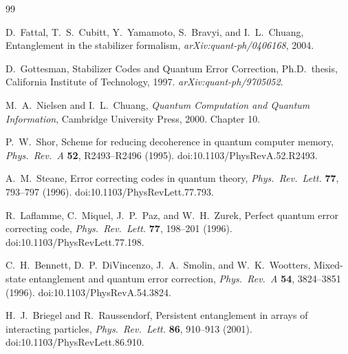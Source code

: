 \documentclass[11pt]{article}
\begin{document}
\begin{thebibliography}{99}

D.~Fattal, T.~S.~Cubitt, Y.~Yamamoto, S.~Bravyi, and I.~L.~Chuang,
Entanglement in the stabilizer formalism,
\textit{arXiv:quant-ph/0406168}, 2004.

D.~Gottesman,
Stabilizer Codes and Quantum Error Correction,
Ph.D.\ thesis, California Institute of Technology, 1997.
\textit{arXiv:quant-ph/9705052}.

M.~A.~Nielsen and I.~L.~Chuang,
\textit{Quantum Computation and Quantum Information},
Cambridge University Press, 2000. Chapter 10.

P.~W.~Shor,
Scheme for reducing decoherence in quantum computer memory,
\textit{Phys.\ Rev.\ A} \textbf{52}, R2493--R2496 (1995).
doi:10.1103/PhysRevA.52.R2493.

A.~M.~Steane,
Error correcting codes in quantum theory,
\textit{Phys.\ Rev.\ Lett.} \textbf{77}, 793--797 (1996).
doi:10.1103/PhysRevLett.77.793.

R.~Laflamme, C.~Miquel, J.~P.~Paz, and W.~H.~Zurek,
Perfect quantum error correcting code,
\textit{Phys.\ Rev.\ Lett.} \textbf{77}, 198--201 (1996).
doi:10.1103/PhysRevLett.77.198.

C.~H.~Bennett, D.~P.~DiVincenzo, J.~A.~Smolin, and W.~K.~Wootters,
Mixed-state entanglement and quantum error correction,
\textit{Phys.\ Rev.\ A} \textbf{54}, 3824--3851 (1996).
doi:10.1103/PhysRevA.54.3824.

H.~J.~Briegel and R.~Raussendorf,
Persistent entanglement in arrays of interacting particles,
\textit{Phys.\ Rev.\ Lett.} \textbf{86}, 910--913 (2001).
doi:10.1103/PhysRevLett.86.910.

\end{thebibliography}
\end{document}
